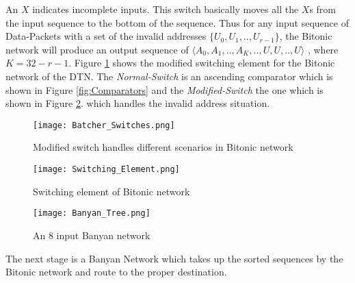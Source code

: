 					      An $X$ indicates incomplete inputs. This switch basically moves all the $X$s from the input sequence to the bottom of the sequence.
					      Thus for any input sequence of Data-Packets with a set of  the invalid addresses $\{U_{0},U_{1},..,U_{r-1}\}$, the Bitonic network will produce an output sequence of $\langle A_{0},A_{1},..,A_{K},..,U,U,..,U \rangle$ , where
					      $ K = 32 - r -1$. Figure \ref{fig:Batcher_Switches} shows the modified switching element for the Bitonic network of the DTN. The \textit{Normal-Switch} is an ascending comparator which is shown in Figure \ref{fig:Comparators} and
					      the \textit{Modified-Switch} the one which is shown in Figure \ref{fig:Switching_Element}. which handles the invalid address situation.
					      \begin{figure}[!ht]
						      \texttt{[image: Batcher\_Switches.png]}
						      \caption{Modified switch handles different scenarios in Bitonic network}
					      \label{fig:Batcher_Switches}
					      \end{figure}
					      \begin{figure}[!ht]
						      \texttt{[image: Switching\_Element.png]}
						      \caption{Switching element of Bitonic network}
					      \label{fig:Switching_Element}
					      \end{figure}
					      \begin{figure}[!ht]
						      \texttt{[image: Banyan\_Tree.png]}
						      \caption{An 8 input Banyan network}
					      \label{fig:Banyan_Tree}
					      \end{figure}
					      The next stage is a Banyan Network which takes up the sorted sequences by the Bitonic network and route to the proper destination. 
					      
